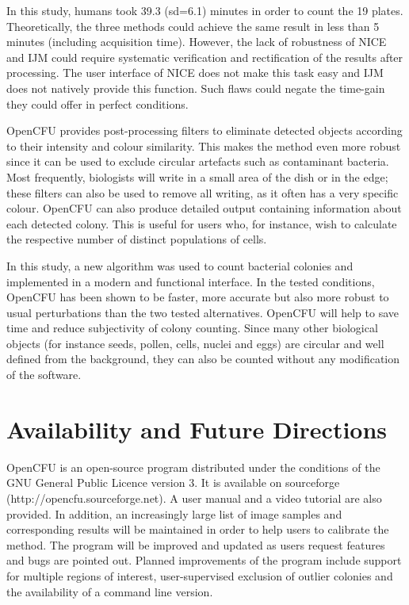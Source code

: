 \documentclass[10pt]{article}
\newcommand{\website}{http://opencfu.sourceforge.net}
\newcommand{\humantime}{39.3 (sd=6.1)}
\newcommand{\IJM}{IJM}
\begin{document}
In this study, humans took \humantime{} minutes in order to count the 19 plates.
Theoretically, the three methods could achieve the same result in less
than 5 minutes (including acquisition time). However, the lack of robustness of
NICE and \IJM{} could require systematic verification and
rectification of the results after processing. The user interface of NICE does not make this task easy and \IJM{} does not natively
provide this function. Such flaws could negate the time-gain they
could offer in perfect conditions.

 

OpenCFU provides post-processing filters to eliminate detected
objects according to their intensity and colour similarity. This makes the method
even more robust since it can be used to exclude circular artefacts such as
contaminant bacteria. Most frequently, biologists will write in a small area of
the dish or in the edge; these filters can also be used to remove all writing, as it often has a very specific colour.
OpenCFU can also produce detailed output containing information about each detected
colony. This is useful for users who, for instance, wish to calculate the
respective number of distinct populations of cells.

In this study, a new algorithm was used to count bacterial colonies and
implemented in a modern and functional interface. In the tested conditions,
OpenCFU has been shown to be faster, more accurate but
also more robust to usual perturbations than the two tested alternatives.
OpenCFU will help to save time and reduce subjectivity of colony
counting. Since many other biological objects (for instance seeds, pollen, cells,
nuclei and eggs) are circular and well defined from the background, they 
can
also be counted without any modification of the software.

\section*{Availability and Future Directions}
OpenCFU is an open-source program distributed under the conditions of the GNU
General Public Licence version 3. It is available on sourceforge (\website{}). A
user manual and a video tutorial are also provided. In addition, an increasingly large list
of image samples and corresponding results will be maintained in order 
to 
help users to calibrate the method. 
The program will be improved
and updated as users request features and bugs are pointed out.
Planned improvements of the program include support for multiple regions of interest,
user-supervised exclusion of outlier colonies and the availability of 
a
command line version.
\end{document}
